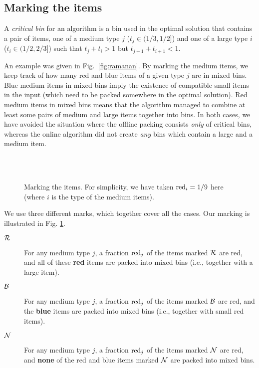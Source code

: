 \subsection{Marking the items}
\label{sec:mark-and-color}

\begin{definition}
A \emph{critical bin} for an {\EHarm} algorithm is a bin used in the optimal solution that contains a pair of items,  one of a medium type $j$ ($t_j\in(1/3,1/2]$) and one of a large type $i$ ($t_i\in(1/2,2/3]$) such that $t_j+t_i>1$ but $t_{j+1} + t_{i+1}<1$.
\end{definition}
An example was given in Fig.~\ref{fig:ramanan}.
By marking the medium items, we keep track of how many red and blue items of a given type $j$ are in mixed bins.
Blue medium items in mixed bins imply the existence of compatible small items in the input
(which need to be packed somewhere in the optimal solution).
Red medium items in mixed bins means that the algorithm managed to combine at least some pairs of medium and large items
together into bins. In both cases, we have avoided the situation where the offline packing consists \emph{only} of
critical bins, whereas the online algorithm did not create \emph{any} bins which contain a large and a medium item.
\begin{figure}[t]
	\begin{center}
	\\
	\\
	\end{center}
	\caption{Marking the items.
	For simplicity, we have taken $\mathrm{red}_i=1/9$ here (where $i$ is the type of the medium items).
	\label{fig:marking}}
\end{figure}
We use three different marks, which together cover all the cases. Our marking is illustrated in Fig. \ref{fig:marking}. 
\begin{description}
\item[$\mathcal{R}$] For any medium type $j$, a fraction $\mathrm{red}_j$ of the items marked $\mathcal{R}$
are red, and all of these
\textbf{red} items are packed into mixed bins (i.e., together with a large item).
\item[$\mathcal{B}$] For any medium type $j$, a fraction $\mathrm{red}_j$ of the items marked $\mathcal{B}$
are red, and the \textbf{blue} items are packed into mixed bins (i.e., together with small red items).
\item[$\mathcal{N}$] For any medium type $j$, a fraction $\mathrm{red}_j$ of the items marked $\mathcal{N}$
are red, and \textbf{none} of the red and blue items marked $\mathcal{N}$ are packed into mixed bins.
\end{description}

